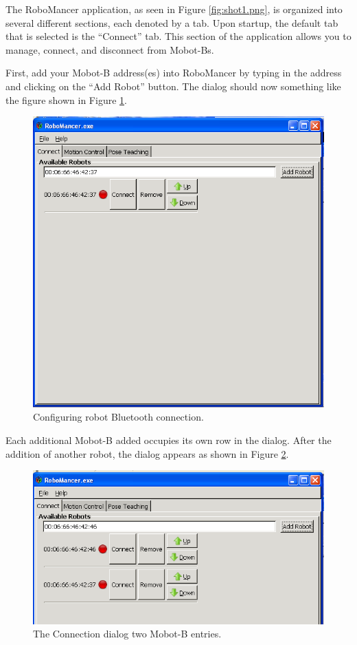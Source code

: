 \documentclass{article}
\begin{document}
The RoboMancer application, as seen in Figure \ref{fig:shot1.png}, is organized into
several different sections, each denoted by a tab. Upon startup, the default tab
that is selected is the ``Connect'' tab. This section of the application allows
you to manage, connect, and disconnect from Mobot-Bs. 

First, add your Mobot-B address(es) into RoboMancer by typing in the address and
clicking on the ``Add Robot'' button. The dialog should now something like
the figure shown in Figure \ref{fig:shot3.png}. 

\begin{figure}[H]
\begin{center}
\includegraphics[width=4.5in]{images/robomancer_screenshot3.png}
\end{center}
\caption{\label{fig:shot3.png} Configuring robot Bluetooth connection.}
\end{figure}

Each additional Mobot-B added occupies its own row in the dialog. After the addition
of another robot, the dialog appears as shown in Figure \ref{fig:shot4_a.png}.

\begin{figure}[H]
\begin{center}
\includegraphics[width=4.5in]{images/robomancer_screenshot4.png}
\end{center}
\caption{\label{fig:shot4_a.png} The Connection dialog two Mobot-B entries.}
\end{figure}
\end{document}
